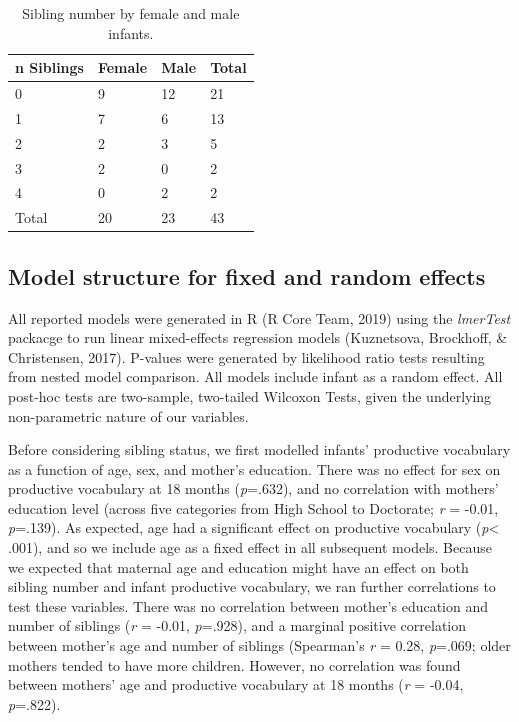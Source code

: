 \documentclass[man,floatsintext]{apa6}
\begin{document}
\begin{table}[H]
\begin{center}
\begin{threeparttable}
\caption{\label{tab:table-sibling-number}Sibling number by female and male infants.}
\small{
\begin{tabular}{llll}
\toprule
n Siblings & \multicolumn{1}{c}{Female} & \multicolumn{1}{c}{Male} & \multicolumn{1}{c}{Total}\\
\midrule
0 & 9 & 12 & 21\\
1 & 7 & 6 & 13\\
2 & 2 & 3 & 5\\
3 & 2 & 0 & 2\\
4 & 0 & 2 & 2\\
Total & 20 & 23 & 43\\
\bottomrule
\end{tabular}
}
\end{threeparttable}
\end{center}
\end{table}

\hypertarget{model-structure-for-fixed-and-random-effects}{%
\subsection{Model structure for fixed and random effects}\label{model-structure-for-fixed-and-random-effects}}

All reported models were generated in R (R Core Team, 2019) using the \emph{lmerTest} packacge to run linear mixed-effects regression models (Kuznetsova, Brockhoff, \& Christensen, 2017). P-values were generated by likelihood ratio tests resulting from nested model comparison. All models include infant as a random effect. All post-hoc tests are two-sample, two-tailed Wilcoxon Tests, given the underlying non-parametric nature of our variables.

Before considering sibling status, we first modelled infants' productive vocabulary as a function of age, sex, and mother's education. There was no effect for sex on productive vocabulary at 18 months (\emph{p}=.632), and no correlation with mothers' education level (across five categories from High School to Doctorate; \emph{r} = -0.01, \emph{p}=.139). As expected, age had a significant effect on productive vocabulary (\emph{p}\textless{} .001), and so we include age as a fixed effect in all subsequent models. Because we expected that maternal age and education might have an effect on both sibling number and infant productive vocabulary, we ran further correlations to test these variables. There was no correlation between mother's education and number of siblings (\emph{r} = -0.01, \emph{p}=.928), and a marginal positive correlation between mother's age and number of siblings (Spearman's \emph{r} = 0.28, \emph{p}=.069; older mothers tended to have more children. However, no correlation was found between mothers' age and productive vocabulary at 18 months (\emph{r} = -0.04, \emph{p}=.822).
\end{document}

